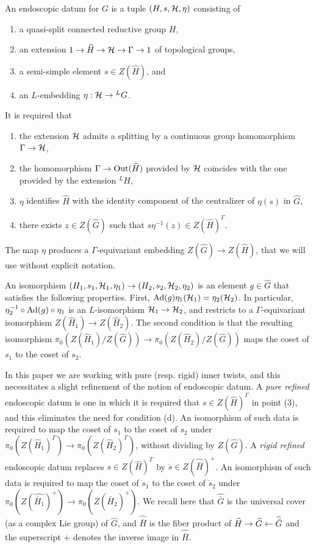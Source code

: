 \documentclass{article}
\theoremstyle{definition}
\numberwithin{equation}{section}
\renewcommand{\-}{\hyp{}}
\begin{document}
An endoscopic datum for $G$ is a tuple $(H,s,\mathcal{H},\eta)$ consisting of
\begin{enumerate}[label=(\arabic*)]
	\item a quasi-split connected reductive group $H$,
	\item an extension $1 \to \widehat H \to \mathcal{H} \to \Gamma \to 1$ of topological groups,
	\item a semi-simple element $s \in Z(\hat H)$, and
	\item an $L$\-embedding $\eta : \mathcal{H} \to {^LG}$.
\end{enumerate}
It is required that
\begin{enumerate}[label=(\alph*)]
	\item the extension $\mathcal{H}$ admits a splitting by a continuous group homomorphism $\Gamma \to \mathcal{H}$,
	\item the homomorphism $\Gamma \to \textrm{Out}(\widehat H)$ provided by $\mathcal{H}$ coincides with the one provided by the extension $^LH$,
	\item $\eta$ identifies $\hat H$ with the identity component of the centralizer of $\eta(s)$ in $\hat G$,
	\item there exists $z \in Z(\hat G)$ such that $s\eta^{-1}(z) \in Z(\hat H)^\Gamma$.
\end{enumerate}
The map $\eta$ produces a $\Gamma$-equivariant embedding $Z(\hat G) \to Z(\hat H)$, that we will use without explicit notation.

An isomorphism $(H_1,s_1,\mathcal{H}_1,\eta_1) \to (H_2,s_2,\mathcal{H}_2,\eta_2)$ is an element $g \in \hat G$ that satisfies the following properties. First, $\textrm{Ad}(g)\eta_1(\mathcal{H}_1)=\eta_2(\mathcal{H}_2)$. In particular, $\eta_2^{-1}\circ\textrm{Ad}(g)\circ\eta_1$ is an $L$\-isomorphism $\mathcal{H}_1 \to \mathcal{H}_2$, and restricts to a $\Gamma$-equivariant isomorphism $Z(\hat H_1) \to Z(\hat H_2)$. The second condition is that the resulting isomorphism $\pi_0(Z(\hat H_1)/Z(\hat G)) \to \pi_0(Z(\hat H_2)/Z(\hat G))$ maps the coset of $s_1$ to the coset of $s_2$.

In this paper we are working with pure (resp. rigid) inner twists, and this necessitates a slight refinement of the notion of endoscopic datum. A \emph{pure refined} endoscopic datum is one in which it is required that $s \in Z(\hat H)^\Gamma$ in point (3), and this eliminates the need for condition (d). An isomorphism of such data is required to map the coset of $s_1$ to the coset of $s_2$ under $\pi_0(Z(\hat H_1)^\Gamma) \to \pi_0(Z(\hat H_2)^\Gamma)$, without dividing by $Z(\hat G)$. A \emph{rigid refined} endoscopic datum replaces $s \in Z(\hat H)^\Gamma$ by $\dot s \in Z(\hat{\bar H} )^+$. An isomorphism of such data is required to map the coset of $\dot s_1$ to the coset of $\dot s_2$ under $\pi_0(Z(\hat{\bar H_1})^+) \to \pi_0(Z(\hat{ \bar H_2})^+)$. We recall here that $\hat{\bar G}$ is the universal cover (as a complex Lie group) of $\hat G$, and $\hat{\bar H}$ is the fiber product of $\widehat H \to \widehat G \leftarrow \widehat{\bar G}$ and the superscript $+$ denotes the inverse image in $\hat{\bar H}.$
\end{document}
